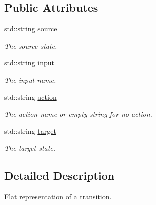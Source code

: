 \subsection*{Public Attributes}
\begin{DoxyCompactItemize}
\item 
\hypertarget{structfsml_1_1FlatStep_a0d750cd9f657776ffc88627a44d9fdf6}{std\-::string \hyperlink{structfsml_1_1FlatStep_a0d750cd9f657776ffc88627a44d9fdf6}{source}}\label{structfsml_1_1FlatStep_a0d750cd9f657776ffc88627a44d9fdf6}

\begin{DoxyCompactList}\small\item\em The source state. \end{DoxyCompactList}\item 
\hypertarget{structfsml_1_1FlatStep_a69f42f7f8091dff898b7944a12cb563e}{std\-::string \hyperlink{structfsml_1_1FlatStep_a69f42f7f8091dff898b7944a12cb563e}{input}}\label{structfsml_1_1FlatStep_a69f42f7f8091dff898b7944a12cb563e}

\begin{DoxyCompactList}\small\item\em The input name. \end{DoxyCompactList}\item 
\hypertarget{structfsml_1_1FlatStep_a910a78d294c31aea42fc23babd361cdb}{std\-::string \hyperlink{structfsml_1_1FlatStep_a910a78d294c31aea42fc23babd361cdb}{action}}\label{structfsml_1_1FlatStep_a910a78d294c31aea42fc23babd361cdb}

\begin{DoxyCompactList}\small\item\em The action name or empty string for no action. \end{DoxyCompactList}\item 
\hypertarget{structfsml_1_1FlatStep_a2a4242c4ad9b86ce6e1fc638ed4427be}{std\-::string \hyperlink{structfsml_1_1FlatStep_a2a4242c4ad9b86ce6e1fc638ed4427be}{target}}\label{structfsml_1_1FlatStep_a2a4242c4ad9b86ce6e1fc638ed4427be}

\begin{DoxyCompactList}\small\item\em The target state. \end{DoxyCompactList}\end{DoxyCompactItemize}


\subsection{Detailed Description}
Flat representation of a transition. 



